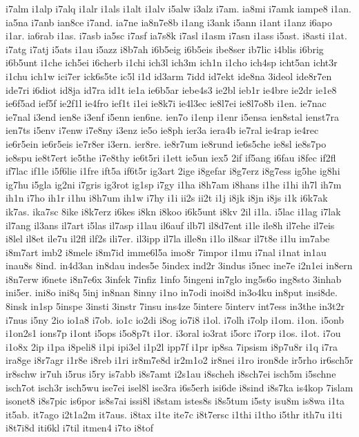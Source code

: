 {i7alm
i1alp
i7alq
i1alr
i1als
i1alt
i1alv
i5alw
i3alz
i7am.
ia8mi
i7amk
iampe8
i1an.
ia5na
i7anb
ian8ce
i7and.
ia7ne
ia8n7e8b
i1ang
i3ank
i5ann
i1ant
i1anz
i6apo
i1ar.
ia6rab
i1as.
i7asb
ia5sc
i7asf
ia7s8k
i7asl
i1asm
i7asn
i1ass
i5ast.
i8asti
i1at.
i7atg
i7atj
i5ats
i1au
i5azz
i8b7ah
i6b5eig
i6b5eis
ibe8ser
ib7lic
i4blis
i6brig
i6b5unt
i1che
ich5ei
i6cherb
i1chi
ich3l
ich3m
ich1n
i1cho
ich4sp
icht5an
icht3r
i1chu
ich1w
ici7er
ick6s5te
ic5l
i1d
id3arm
7idd
id7ekt
ide8na
3ideol
ide8r7en
ide7ri
i6diot
id8ja
id7ra
id1t
ie1a
ie6b5ar
iebe4s3
ie2bl
ieb1r
ie4bre
ie2dr
ie1e8
ie6f5ad
ief5f
ie2f1l
ie4fro
ief1t
i1ei
ie8k7i
ie4l3ec
ie8l7ei
ie8l7o8b
i1en.
ie7nac
ie7nal
i3end
ien8e
i3enf
i5enn
ien6ne.
ien7o
i1enp
i1enr
i5ensa
ien8stal
ienst7ra
ien7ts
i5env
i7enw
i7e8ny
i3enz
ie5o
ie8ph
ier3a
iera4b
ie7ral
ie4rap
ie4rec
ie6r5ein
ie6r5eis
ie7r8er
i3ern.
ier8re.
ie8r7um
ie8rund
ie6s5che
ie8sl
ie8s7po
ie8spu
ie8t7ert
ie5the
i7e8thy
ie6t5ri
i1ett
ie5un
iex5
2if
if5ang
i6fau
i8fec
if2fl
if7lac
if1le
i5f6lie
i1fre
ift5a
if6t5r
ig3art
2ige
i8gefar
i8g7erz
i8g7ess
ig5he
ig8hi
ig7hu
i5gla
ig2ni
i7gris
ig3rot
ig1sp
i7gy
i1ha
i8h7am
i8hans
i1he
i1hi
ih7l
ih7m
ih1n
i7ho
ih1r
i1hu
i8h7um
ih1w
i7hy
i1i
ii2s
ii2t
i1j
i8jk
i8jn
i8js
i1k
i6k7ak
ik7as.
ika7sc
8ike
i8k7erz
i6kes
i8kn
i8koo
i6k5unt
i8kv
2il
i1la.
i5lac
i1lag
i7lak
il7ang
il3ans
il7art
i5las
il7asp
i1lau
il6auf
ilb7l
il8d7ent
i1le
ile8h
il7ehe
il7eis
i8lel
il8et
ile7u
il2fl
ilf2s
ili7er.
il3ipp
il7la
ille8n
i1lo
il8sar
il7t8e
i1lu
im7abe
i8m7art
imb2
i8mele
i8m7id
imme6l5a
imo8r
7impor
i1mu
i7nal
i1nat
in1au
inau8s
8ind.
in4d3an
in8dau
indes5e
5index
ind2r
3indus
i5nec
ine7e
i2n1ei
in8ern
i8n7erw
i6nete
i8n7e6x
3infek
7infiz
1info
5ingeni
in7glo
ing5s6o
ing8sto
3inhab
ini5er.
ini8o
ini8q
5inj
in8nan
8inny
i1no
in7odi
inoi8d
in3o4ku
in8put
insi8de.
8insk
in1sp
5inspe
3insti
3instr
7insu
ins4ze
5intere
5interv
int7ess
in3the
in3t2r
i7nus
i5ny
2io
io1a8
i7ob.
io1c
io2di
i8og
io7i8
i1ol.
i7olh
i7olp
i1om.
i1on.
i5onb
i1on2s1
ions7p
i1ont
i5ops
i5o8p7t
i1or.
i3oral
io3rat
i5orc
i7orp
i1os.
i1ot.
i7ou
i1o8x
2ip
i1pa
i8peli8
i1pi
ipi3el
i1p2l
ipp7f
i1pr
ip8sa
7ipsism
i8p7u8r
i1q
i7ra
ira8ge
i8r7agr
i1r8e
i8reb
i1ri
ir8m7e8d
ir2m1o2
ir8nei
i1ro
iron8de
ir5rho
ir6sch5r
ir8schw
ir7uh
i5rus
i5ry
is7abb
i8s7amt
i2s1au
i8scheh
i8sch7ei
isch5m
i5schne
isch7ot
isch3r
isch5wu
ise7ei
isel8l
ise3ra
i6s5erh
isi6de
i8sind
i8s7ka
is4kop
7islam
isonet8
i8s7pic
is6por
is8s7ai
issi8l
i8stam
istes8s
i8s5tum
i5sty
isu8m
is8wa
i1ta
it5ab.
it7ago
i2t1a2m
it7aus.
i8tax
i1te
ite7c
i8t7ersc
i1thi
i1tho
i5thr
ith7u
i1ti
i8t7i8d
iti6kl
i7til
itmen4
i7to
i8tof
}
